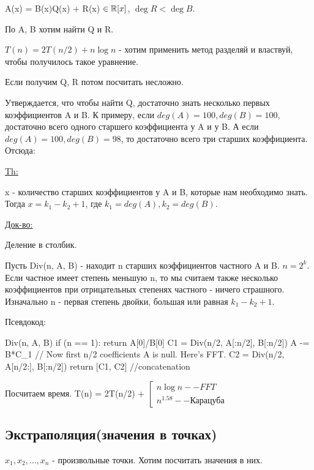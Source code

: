 A(x) = B(x)Q(x) + R(x) $\in \mathbb{R}[x]$, $\deg R < \deg B$.

По A, B хотим найти Q и R.

$T(n) = 2T(n/2) + n \log n$ - хотим применить метод разделяй и властвуй, чтобы получилось такое уравнение.

Если получим Q, R потом посчитать несложно.

Утверждается, что чтобы найти Q, достаточно знать несколько первых коэффициентов A и B. К примеру, если $deg(A) = 100, deg(B) = 100$, достаточно всего одного старшего коэффициента у A и у B. А если $deg(A) = 100, deg(B) = 98$, то достаточно всего три старших коэффициента. Отсюда:

\underline{Th:}

x - количество старших коэффициентов у A и B, которые нам необходимо знать. Тогда $x = k_1 - k_2 + 1$, где $k_1 = deg(A), k_2 = deg(B)$.

\underline{Док-во:}

Деление в столбик.

Пусть Div(n, A, B) - находит n старших коэффициентов частного A и B. $n = 2^k$. Если частное имеет степень меньшую n, то мы считаем также несколько коэффициентов при отрицательных степенях частного - ничего страшного. Изначально n - первая степень двойки, большая или равная $k_1 - k_2 + 1$.

Псевдокод:

\begin{cppcode}
Div(n, A, B) {
    if (n == 1): return A[0]/B[0]
    C1 = Div(n/2, A[:n/2], B[:n/2])
    A -= B*C_1 // Now first n/2 coefficients A is null. Here's FFT.
    C2 = Div(n/2, A[n/2:], B[:n/2])
    return [C1, C2] //concatenation 
}
\end{cppcode}

Посчитаем время. T(n) = 2T(n/2) + $\left[ \begin{gathered} 
                                        n \log n -- FFT \\
                                        n^{1.58} -- \text{Карацуба}
                                        \end{gathered}
                                \right.$
                                
\subsection{Экстраполяция(значения в точках)}

$x_1, x_2, \dots, x_n$ - произвольные точки. Хотим посчитать значения в них.

